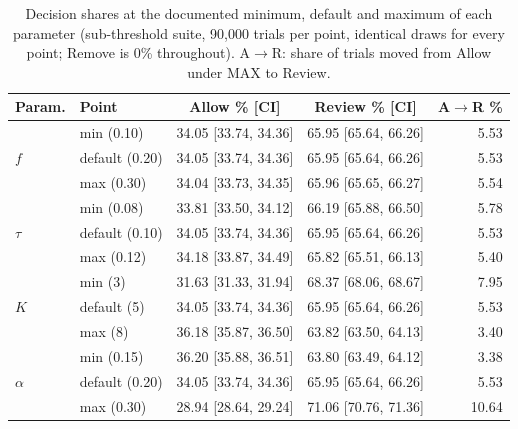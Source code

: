 \begin{table}[!t]
\caption{Decision shares at the documented minimum, default and maximum of each parameter (sub-threshold suite,
90,000 trials per point, identical draws for every point; Remove is 0\% throughout). A$\to$R: share of trials moved
from Allow under MAX to Review.}
\label{tab:decision-sensitivity}
\centering\footnotesize
\begin{tabular}{@{}llccr@{}}
\toprule
\textbf{Param.} & \textbf{Point} & \textbf{Allow \% [CI]} & \textbf{Review \% [CI]} & \textbf{A$\to$R \%} \\
\midrule
\multirow{3}{*}{$f$} & min (0.10) & 34.05 [33.74, 34.36] & 65.95 [65.64, 66.26] & 5.53 \\
 & default (0.20) & 34.05 [33.74, 34.36] & 65.95 [65.64, 66.26] & 5.53 \\
 & max (0.30) & 34.04 [33.73, 34.35] & 65.96 [65.65, 66.27] & 5.54 \\
\midrule
\multirow{3}{*}{$\tau$} & min (0.08) & 33.81 [33.50, 34.12] & 66.19 [65.88, 66.50] & 5.78 \\
 & default (0.10) & 34.05 [33.74, 34.36] & 65.95 [65.64, 66.26] & 5.53 \\
 & max (0.12) & 34.18 [33.87, 34.49] & 65.82 [65.51, 66.13] & 5.40 \\
\midrule
\multirow{3}{*}{$K$} & min (3) & 31.63 [31.33, 31.94] & 68.37 [68.06, 68.67] & 7.95 \\
 & default (5) & 34.05 [33.74, 34.36] & 65.95 [65.64, 66.26] & 5.53 \\
 & max (8) & 36.18 [35.87, 36.50] & 63.82 [63.50, 64.13] & 3.40 \\
\midrule
\multirow{3}{*}{$\alpha$} & min (0.15) & 36.20 [35.88, 36.51] & 63.80 [63.49, 64.12] & 3.38 \\
 & default (0.20) & 34.05 [33.74, 34.36] & 65.95 [65.64, 66.26] & 5.53 \\
 & max (0.30) & 28.94 [28.64, 29.24] & 71.06 [70.76, 71.36] & 10.64 \\
\bottomrule
\end{tabular}
\end{table}
